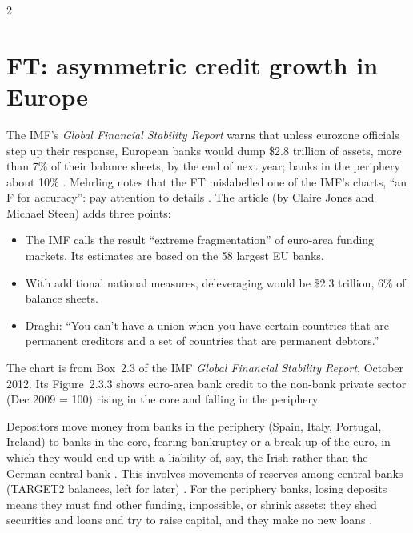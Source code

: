 \begin{paracol}{2}
\section{FT: asymmetric credit growth in Europe}\label{sec:dl-ft}

\begin{casestudy}
The IMF's \emph{Global Financial Stability Report} warns that unless eurozone officials step up their response, European banks would dump \$2.8 trillion of assets, more
than 7\% of their balance sheets, by the end of next year; banks in the periphery about 10\% . Mehrling notes that the FT mislabelled one of the
IMF's charts, ``an F for accuracy'': pay attention to details .
The article (by Claire Jones and Michael Steen) adds three points:
\begin{itemize}
  \item The IMF calls the result ``extreme fragmentation'' of euro-area funding markets. Its estimates are based on the 58 largest EU banks.
  \item With additional national measures, deleveraging would be \$2.3 trillion, 6\% of balance sheets.
  \item Draghi: ``You can't have a union when you have certain countries that are permanent creditors and a set of countries that are permanent debtors.''
\end{itemize}
The chart is from Box~2.3 of the IMF \emph{Global Financial Stability Report}, October 2012. Its Figure~2.3.3 shows euro-area bank credit to the non-bank private sector (Dec 2009 = 100) rising in the core and falling in the periphery.
\end{casestudy}
Depositors move money from banks in the periphery (Spain, Italy, Portugal, Ireland) to banks in the core, fearing bankruptcy or a break-up of the euro, in which
they would end up with a liability of, say, the Irish rather than the German central bank . This involves movements of reserves
among central banks (TARGET2 balances, left for later) . For the periphery banks, losing deposits means they must find other funding, impossible, or
shrink assets: they shed securities and loans and try to raise capital, and they make no new loans .
\begin{taccts}
\qquad

\end{taccts}
\end{paracol}
